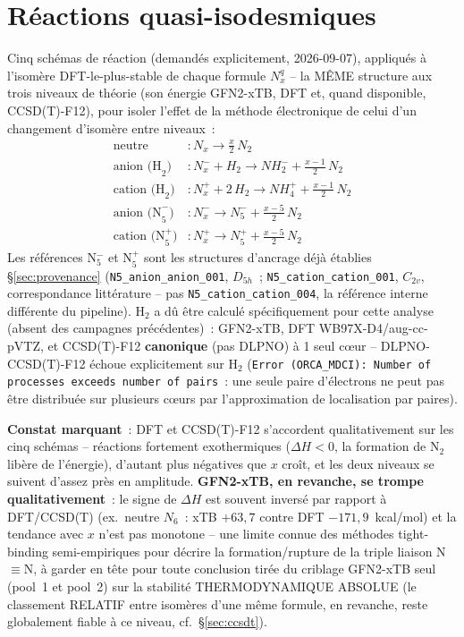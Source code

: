 \documentclass[11pt,a4paper]{article}
\begin{document}


\section{R\'eactions quasi-isodesmiques}
\label{sec:isodesmic}

Cinq sch\'emas de r\'eaction (demand\'es explicitement, 2026-09-07),
appliqu\'es \`a l'isom\`ere DFT-le-plus-stable de chaque formule
$N_x^{q}$ -- la M\^EME structure aux trois niveaux de th\'eorie (son
\'energie GFN2-xTB, DFT et, quand disponible, CCSD(T)-F12), pour isoler
l'effet de la m\'ethode \'electronique de celui d'un changement
d'isom\`ere entre niveaux~:
\begin{align*}
  \text{neutre} &: N_x \to \tfrac{x}{2}\,N_2 \\
  \text{anion (H}_2\text{)} &: N_x^- + H_2 \to NH_2^- + \tfrac{x-1}{2}\,N_2 \\
  \text{cation (H}_2\text{)} &: N_x^+ + 2\,H_2 \to NH_4^+ + \tfrac{x-1}{2}\,N_2 \\
  \text{anion (N}_5^-\text{)} &: N_x^- \to N_5^- + \tfrac{x-5}{2}\,N_2 \\
  \text{cation (N}_5^+\text{)} &: N_x^+ \to N_5^+ + \tfrac{x-5}{2}\,N_2
\end{align*}
Les r\'ef\'erences N$_5^-$ et N$_5^+$ sont les structures d'ancrage
d\'ej\`a \'etablies \S\ref{sec:provenance} (\texttt{N5\_anion\_anion\_001},
$D_{5h}$~; \texttt{N5\_cation\_cation\_001}, $C_{2v}$, correspondance
litt\'erature -- pas \texttt{N5\_cation\_cation\_004}, la r\'ef\'erence
interne diff\'erente du pipeline). H$_2$ a d\^u \^etre calcul\'e
sp\'ecifiquement pour cette analyse (absent des campagnes pr\'ec\'edentes)~:
GFN2-xTB, DFT WB97X-D4/aug-cc-pVTZ, et CCSD(T)-F12 \textbf{canonique}
(pas DLPNO) \`a 1 seul c\oe ur -- DLPNO-CCSD(T)-F12 \'echoue explicitement
sur H$_2$ (\texttt{Error (ORCA\_MDCI): Number of processes exceeds number
of pairs}~: une seule paire d'\'electrons ne peut pas \^etre distribu\'ee
sur plusieurs c\oe urs par l'approximation de localisation par paires).

\textbf{Constat marquant}~: DFT et CCSD(T)-F12 s'accordent qualitativement
sur les cinq sch\'emas -- r\'eactions fortement exothermiques
($\Delta H<0$, la formation de N$_2$ lib\`ere de l'\'energie), d'autant
plus n\'egatives que $x$ croît, et les deux niveaux se suivent d'assez
pr\`es en amplitude. \textbf{GFN2-xTB, en revanche, se trompe
qualitativement}~: le signe de $\Delta H$ est souvent invers\'e par
rapport \`a DFT/CCSD(T) (ex.\ neutre $N_6$~: xTB $+63{,}7$ contre DFT
$-171{,}9$~kcal/mol) et la tendance avec $x$ n'est pas monotone -- une
limite connue des m\'ethodes tight-binding semi-empiriques pour d\'ecrire
la formation/rupture de la triple liaison N$\equiv$N, \`a garder en
t\^ete pour toute conclusion tir\'ee du criblage GFN2-xTB seul (pool~1 et
pool~2) sur la stabilit\'e THERMODYNAMIQUE ABSOLUE (le classement RELATIF
entre isom\`eres d'une m\^eme formule, en revanche, reste globalement
fiable \`a ce niveau, cf.\ \S\ref{sec:ccsdt}).
\end{document}
